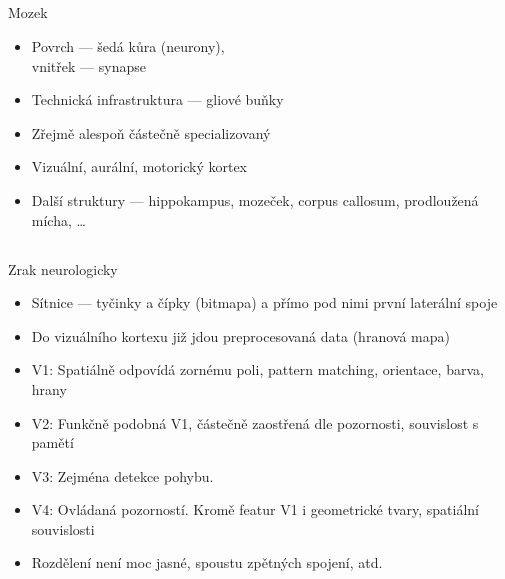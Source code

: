 \documentclass{beamer}
\begin{document}
\subsection{}
\begin{frame}{Mozek}
\begin{itemize}
\item Povrch --- šedá kůra (neurony), \\ vnitřek --- synapse
\item Technická infrastruktura --- gliové buňky
\item Zřejmě alespoň částečně specializovaný
\item Vizuální, aurální, motorický kortex
\item Další struktury --- hippokampus, mozeček, corpus callosum, prodloužená mícha, \dots
\end{itemize}
\end{frame}

\subsection{}
\begin{frame}{Zrak neurologicky}
\begin{itemize}
\item Sítnice --- tyčinky a čípky (bitmapa) a přímo pod nimi první laterální spoje
\item Do vizuálního kortexu již jdou preprocesovaná data (hranová mapa)
\item V1: Spatiálně odpovídá zornému poli, pattern matching, orientace, barva, hrany
\item V2: Funkčně podobná V1, částečně zaostřená dle pozornosti, souvislost s pamětí
\item V3: Zejména detekce pohybu.
\item V4: Ovládaná pozorností. Kromě featur V1 i geometrické tvary, spatiální souvislosti
\item Rozdělení není moc jasné, spoustu zpětných spojení, atd.
\end{itemize}
\end{frame}
\end{document}
